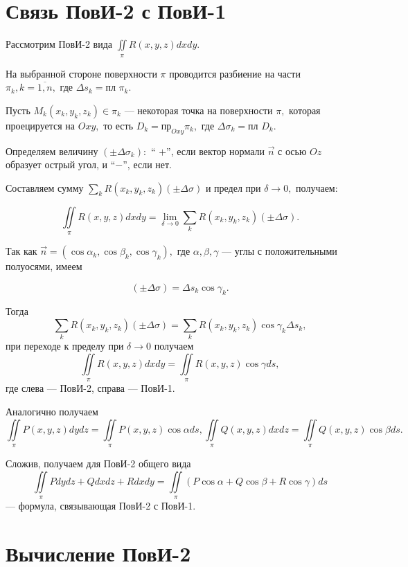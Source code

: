 \documentclass[../../main.tex]{subfiles}
\begin{document}
\section{Связь ПовИ-2 с ПовИ-1}

Рассмотрим ПовИ-2 вида $\iint\limits_\pi R(x, y, z)dxdy.$

На выбранной стороне поверхности $\pi$ проводится разбиение на части $\pi_k,
 k=\overline{1,n},$ где $\Delta s_k =\text{пл }\pi_k.$

Пусть $M_k(x_k, y_k, z_k)\in\pi_k$ --- некоторая точка на поверхности $\pi,$ 
которая проецируется на $Oxy,$ то есть $D_k = \text{пр}_{Oxy} \pi_k,$ где
 $\Delta\sigma_k = \text{пл }D_k.$

Определяем величину $(\pm\Delta\sigma_k):$ \textquotedblleft 
$+$\textquotedblright, если вектор нормали $\vec{n}$ с осью $Oz$ образует
 острый угол, и \textquotedblleft $-$\textquotedblright, если нет.

Составляем сумму $\sum\limits_k R(x_k, y_k, z_k)(\pm\Delta\sigma)$ и предел
 при $\delta\rightarrow 0,$
  получаем:

\[\iint\limits_\pi R(x, y, z)dxdy = \lim_{\delta\rightarrow 0}\sum\limits_k 
R(x_k, y_k, z_k)(\pm \Delta\sigma).\]

Так как $\vec{n}=(\cos\alpha_k, \cos\beta_k, \cos\gamma_k),$ где $\alpha, 
\beta, \gamma$ --- углы с положительными полуосями, имеем

\[(\pm\Delta\sigma) = \Delta s_k\cos\gamma_k.\]

Тогда 
\[\sum\limits_k R(x_k, y_k, z_k)(\pm \Delta\sigma) = \sum\limits_k 
 R(x_k, y_k, z_k) \cos\gamma_k \Delta s_k,\]
при переходе к пределу при $\delta\rightarrow 0$ получаем
\[\iint\limits_\pi R(x, y, z)dxdy = \iint\limits_\pi R(x, y, z) 
\cos\gamma ds,\] где слева --- ПовИ-2, справа --- ПовИ-1.

Аналогично получаем \[\iint\limits_\pi P(x, y, z)dydz = \iint\limits_\pi 
P(x, y, z) \cos\alpha ds, \iint\limits_\pi Q(x, y, z)dxdz = \iint\limits_\pi
 Q(x, y, z) \cos\beta ds.\]

Сложив, получаем для ПовИ-2 общего вида
\begin{equation}\label{lec24, num_1}\iint\limits_\pi Pdydz + Qdxdz + Rdxdy = 
\iint\limits_\pi(P\cos\alpha + Q\cos\beta + R\cos\gamma)ds\end{equation} ---
 формула, связывающая ПовИ-2 с ПовИ-1.

\section{Вычисление ПовИ-2}
\end{document}
